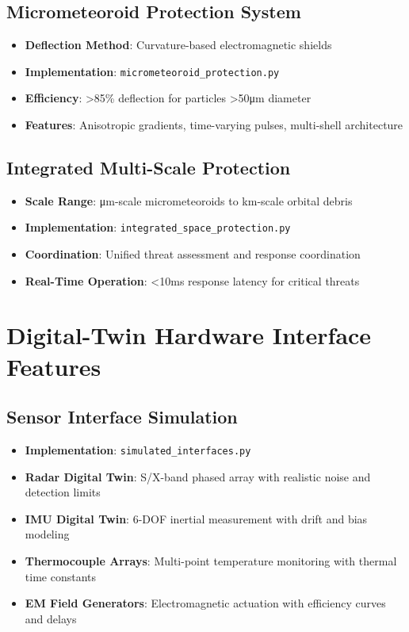 \documentclass[11pt]{article}
\begin{document}
\subsection{Micrometeoroid Protection System}
\begin{itemize}
\item \textbf{Deflection Method}: Curvature-based electromagnetic shields
\item \textbf{Implementation}: \texttt{micrometeoroid\_protection.py}
\item \textbf{Efficiency}: >85\% deflection for particles >50μm diameter
\item \textbf{Features}: Anisotropic gradients, time-varying pulses, multi-shell architecture
\end{itemize}

\subsection{Integrated Multi-Scale Protection}
\begin{itemize}
\item \textbf{Scale Range}: μm-scale micrometeoroids to km-scale orbital debris
\item \textbf{Implementation}: \texttt{integrated\_space\_protection.py}
\item \textbf{Coordination}: Unified threat assessment and response coordination
\item \textbf{Real-Time Operation}: <10ms response latency for critical threats
\end{itemize}

\section{Digital-Twin Hardware Interface Features}

\subsection{Sensor Interface Simulation}
\begin{itemize}
\item \textbf{Implementation}: \texttt{simulated\_interfaces.py}
\item \textbf{Radar Digital Twin}: S/X-band phased array with realistic noise and detection limits
\item \textbf{IMU Digital Twin}: 6-DOF inertial measurement with drift and bias modeling
\item \textbf{Thermocouple Arrays}: Multi-point temperature monitoring with thermal time constants
\item \textbf{EM Field Generators}: Electromagnetic actuation with efficiency curves and delays
\end{itemize}
\end{document}
